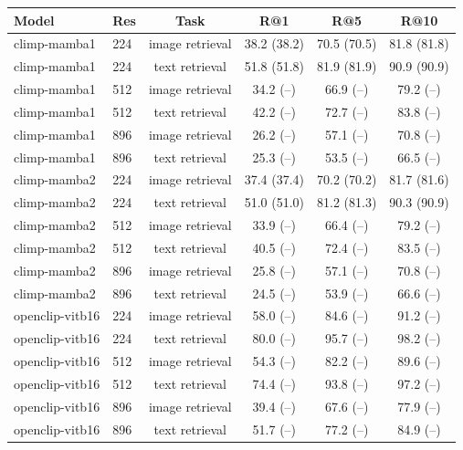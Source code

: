 \begin{tabular}{llcccc}
\toprule
Model & Res & Task & R@1 & R@5 & R@10 \\
\midrule
climp-mamba1 & 224 & image retrieval & 38.2 (38.2) & 70.5 (70.5) & 81.8 (81.8) \\
climp-mamba1 & 224 & text retrieval & 51.8 (51.8) & 81.9 (81.9) & 90.9 (90.9) \\
climp-mamba1 & 512 & image retrieval & 34.2 (–) & 66.9 (–) & 79.2 (–) \\
climp-mamba1 & 512 & text retrieval & 42.2 (–) & 72.7 (–) & 83.8 (–) \\
climp-mamba1 & 896 & image retrieval & 26.2 (–) & 57.1 (–) & 70.8 (–) \\
climp-mamba1 & 896 & text retrieval & 25.3 (–) & 53.5 (–) & 66.5 (–) \\
climp-mamba2 & 224 & image retrieval & 37.4 (37.4) & 70.2 (70.2) & 81.7 (81.6) \\
climp-mamba2 & 224 & text retrieval & 51.0 (51.0) & 81.2 (81.3) & 90.3 (90.9) \\
climp-mamba2 & 512 & image retrieval & 33.9 (–) & 66.4 (–) & 79.2 (–) \\
climp-mamba2 & 512 & text retrieval & 40.5 (–) & 72.4 (–) & 83.5 (–) \\
climp-mamba2 & 896 & image retrieval & 25.8 (–) & 57.1 (–) & 70.8 (–) \\
climp-mamba2 & 896 & text retrieval & 24.5 (–) & 53.9 (–) & 66.6 (–) \\
openclip-vitb16 & 224 & image retrieval & 58.0 (–) & 84.6 (–) & 91.2 (–) \\
openclip-vitb16 & 224 & text retrieval & 80.0 (–) & 95.7 (–) & 98.2 (–) \\
openclip-vitb16 & 512 & image retrieval & 54.3 (–) & 82.2 (–) & 89.6 (–) \\
openclip-vitb16 & 512 & text retrieval & 74.4 (–) & 93.8 (–) & 97.2 (–) \\
openclip-vitb16 & 896 & image retrieval & 39.4 (–) & 67.6 (–) & 77.9 (–) \\
openclip-vitb16 & 896 & text retrieval & 51.7 (–) & 77.2 (–) & 84.9 (–) \\
\bottomrule
\end{tabular}
